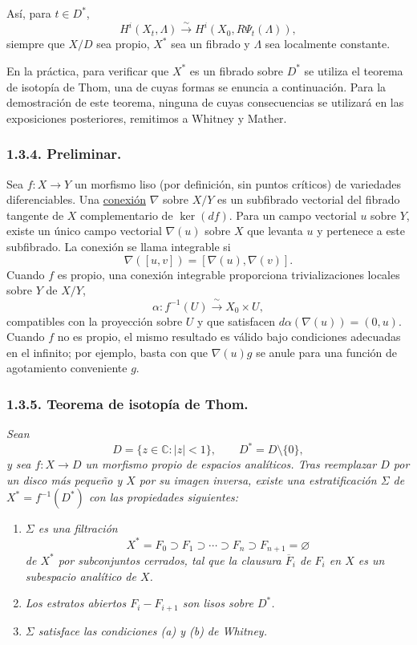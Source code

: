 \pageoriginale

Así, para $t\in D^*$,
\begin{equation}\tag{1.3.3.2}
H^i(X_t,\Lambda)
\xrightarrow{\ \sim\ }
H^i(X_0,R\Psi_t(\Lambda)),
\end{equation}
siempre que $X/D$ sea propio, $X^*$ sea un fibrado y $\Lambda$ sea localmente
constante.

En la práctica, para verificar que $X^*$ es un fibrado sobre $D^*$ se utiliza
el teorema de isotopía de Thom, una de cuyas formas se enuncia a continuación.
Para la demostración de este teorema, ninguna de cuyas consecuencias se
utilizará en las exposiciones posteriores, remitimos a Whitney y Mather.

\subsubsection*{1.3.4. Preliminar.}
Sea $f:X\longrightarrow Y$ un morfismo liso (por definición, sin puntos
críticos) de variedades diferenciables. Una \underline{conexión} $\nabla$
sobre $X/Y$ es un subfibrado vectorial del fibrado tangente de $X$
complementario de $\ker(df)$. Para un campo vectorial $u$ sobre $Y$, existe un
único campo vectorial $\nabla(u)$ sobre $X$ que levanta $u$ y pertenece a este
subfibrado. La conexión se llama integrable si
\[
\nabla([u,v])=[\nabla(u),\nabla(v)].
\]
Cuando $f$ es propio, una conexión integrable proporciona trivializaciones
locales sobre $Y$ de $X/Y$,
\[
\alpha:f^{-1}(U)\xrightarrow{\ \sim\ }X_0\times U,
\]
compatibles con la proyección sobre $U$ y que satisfacen
$d\alpha(\nabla(u))=(0,u)$. Cuando $f$ no es propio, el mismo resultado es
válido bajo condiciones adecuadas en el infinito; por ejemplo, basta con que
$\nabla(u)g$ se anule para una función de agotamiento conveniente $g$.

\subsubsection*{1.3.5. Teorema de isotopía de Thom.}
\textit{Sean
\[
D=\{z\in\mathbb C:|z|<1\},
\qquad D^*=D\setminus\{0\},
\]
y sea $f:X\longrightarrow D$ un morfismo propio de espacios analíticos. Tras
reemplazar $D$ por un disco más pequeño y $X$ por su imagen inversa, existe
una estratificación $\Sigma$ de $X^*=f^{-1}(D^*)$ con las propiedades
siguientes:}

\begin{enumerate}[label=(\alph*),leftmargin=2.7em]
\item \textit{$\Sigma$ es una filtración
\[
X^*=F_0\supset F_1\supset\cdots\supset F_n
\supset F_{n+1}=\varnothing
\]
de $X^*$ por subconjuntos cerrados, tal que la clausura $\overline F_i$ de
$F_i$ en $X$ es un subespacio analítico de $X$.}

\pageoriginale

\item \textit{Los estratos abiertos $F_i-F_{i+1}$ son lisos sobre $D^*$.}

\item \textit{$\Sigma$ satisface las condiciones (a) y (b) de Whitney.}
\end{enumerate}

